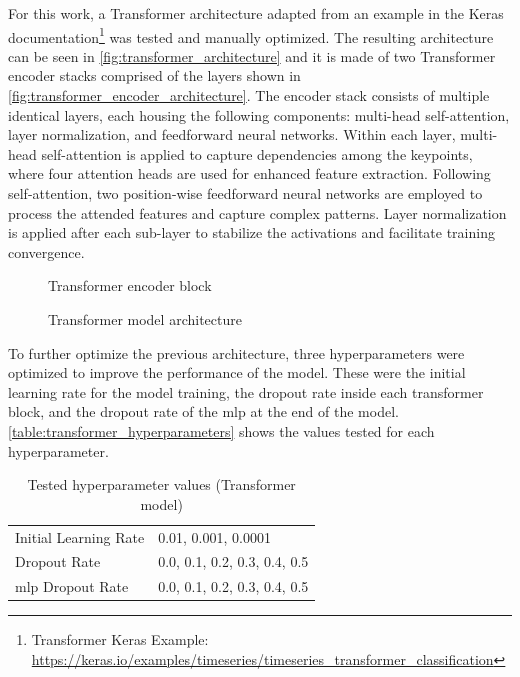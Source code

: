 For this work, a Transformer architecture adapted from an example in the Keras documentation\footnote{Transformer Keras Example: \url{https://keras.io/examples/timeseries/timeseries_transformer_classification}} was tested and manually optimized. The resulting architecture can be seen in \autoref{fig:transformer_architecture} and it is made of two Transformer encoder stacks comprised of the layers shown in \autoref{fig:transformer_encoder_architecture}. The encoder stack consists of multiple identical layers, each housing the following components: multi-head self-attention, layer normalization, and feedforward neural networks. Within each layer, multi-head self-attention is applied to capture dependencies among the keypoints, where four attention heads are used for enhanced feature extraction. Following self-attention, two position-wise feedforward neural networks are employed to process the attended features and capture complex patterns. Layer normalization is applied after each sub-layer to stabilize the activations and facilitate training convergence. 

\begin{figure}[ht]
    \centering
    {\fontsize{10}{12}\selectfont}
    \caption{Transformer encoder block}
    \label{fig:transformer_encoder_architecture}
\end{figure}

\begin{figure}[ht]
    \centering
    {\fontsize{10}{12}\selectfont}
    \caption{Transformer model architecture}
    \label{fig:transformer_architecture}
\end{figure}

To further optimize the previous architecture, three hyperparameters were optimized to improve the performance of the model. These were the initial learning rate for the model training, the dropout rate inside each transformer block, and the dropout rate of the \acl{mlp} at the end of the model. \autoref{table:transformer_hyperparameters} shows the values tested for each hyperparameter.

\begin{table}[ht]
    \centering
    \caption{Tested hyperparameter values (Transformer model)}
    \label{table:transformer_hyperparameters}
    \begin{tabular}{ll}
        \toprule
        Initial Learning Rate & 0.01, 0.001, 0.0001 \\
        Dropout Rate & 0.0, 0.1, 0.2, 0.3, 0.4, 0.5 \\
        \acs{mlp} Dropout Rate & 0.0, 0.1, 0.2, 0.3, 0.4, 0.5 \\
        \bottomrule
    \end{tabular}
\end{table}

